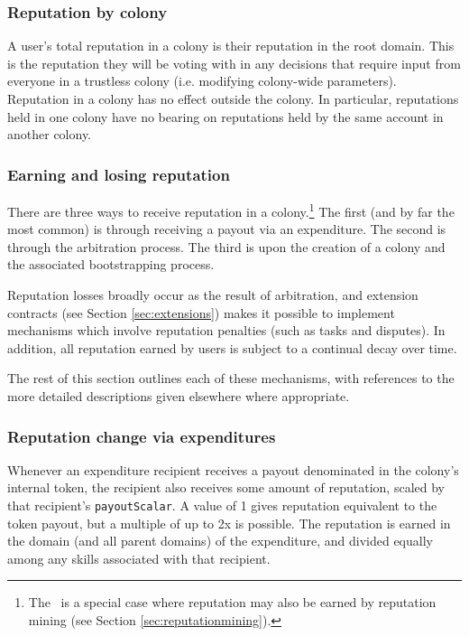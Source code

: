 \subsubsection*{Reputation by colony}\label{sec:rep-by-colony}

A user's total reputation in a colony is their reputation in the root domain. This is the reputation they will be voting with in any decisions that require input from everyone in a trustless colony (i.e. modifying colony-wide parameters). Reputation in a colony has no effect outside the colony. In particular, reputations held in one colony have no bearing on reputations held by the same account in another colony.

\subsubsection{Earning and losing reputation}\label{sec:earning-losing-rep}

There are three ways to receive reputation in a colony.\footnote{The \rc\ is a special case where reputation may also be earned by reputation mining (see Section \ref{sec:reputationmining}).} The first (and by far the most common) is through receiving a payout via an expenditure. The second is through the arbitration process. The third is upon the creation of a colony and the associated bootstrapping process.

Reputation losses broadly occur as the result of arbitration, and extension contracts (see Section \ref{sec:extensions}) makes it possible to implement mechanisms which involve reputation penalties (such as tasks and disputes). In addition, all reputation earned by users is subject to a continual decay over time.

The rest of this section outlines each of these mechanisms, with references to the more detailed descriptions given elsewhere where appropriate.

\subsubsection*{Reputation change via expenditures}

Whenever an expenditure recipient receives a payout denominated in the colony's internal token, the recipient also receives some amount of reputation, scaled by that recipient's \texttt{payoutScalar}. A value of 1 gives reputation equivalent to the token payout, but a multiple of up to 2x is possible. The reputation is earned in the domain (and all parent domains) of the expenditure, and divided equally among any skills associated with that recipient.

